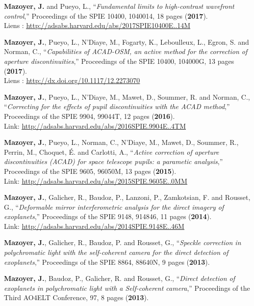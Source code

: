 \documentclass[11pt,a4paper, french]{article}
\begin{document}
\begin{etaremune}

\item \textbf{Mazoyer, J.} and Pueyo, L., “\textit{Fundamental limits to high-contrast wavefront control},” Proceedings of the SPIE 10400, 1040014, 18 pages (\textbf{2017}).\\
Liens : \textcolor{BrickRed}{\underline{\url{http://adsabs.harvard.edu/abs/2017SPIE10400E..14M}}}
\item \textbf{Mazoyer, J.}, Pueyo, L., N’Diaye, M., Fogarty, K., Leboulleux, L., Egron, S. and Norman, C., “\textit{Capabilities of ACAD-OSM, an active method for the correction of aperture discontinuities},” Proceedings of the SPIE 10400, 104000G, 13 pages (\textbf{2017}).\\
Liens : \textcolor{BrickRed}{\underline{\url{http://dx.doi.org/10.1117/12.2273070}}}
\item \textbf{Mazoyer, J.}, Pueyo, L., N’Diaye, M., Mawet, D., Soummer, R. and Norman, C., “\textit{Correcting for the effects of pupil discontinuities with the ACAD method},” Proceedings of the SPIE 9904, 99044T, 12 pages (\textbf{2016}).\\
Link: \textcolor{BrickRed}{\underline{\url{http://adsabs.harvard.edu/abs/2016SPIE.9904E..4TM}}}
\item \textbf{Mazoyer, J.}, Pueyo, L., Norman, C., N’Diaye, M., Mawet, D., Soummer, R., Perrin, M., Choquet, É. and Carlotti, A., “\textit{Active correction of aperture discontinuities (ACAD) for space telescope pupils: a parametic analysis},” Proceedings of the SPIE 9605, 96050M, 13 pages (\textbf{2015}).\\
Link: \textcolor{BrickRed}{\underline{\url{http://adsabs.harvard.edu/abs/2015SPIE.9605E..0MM}}}
\item \textbf{Mazoyer, J.}, Galicher, R., Baudoz, P., Lanzoni, P., Zamkotsian, F. and Rousset, G., “\textit{Deformable mirror interferometric analysis for the direct imagery of exoplanets},” Proceedings of the SPIE 9148, 914846, 11 pages (\textbf{2014}).\\
Link: \textcolor{BrickRed}{\underline{\url{http://adsabs.harvard.edu/abs/2014SPIE.9148E..46M}}}
\item \textbf{Mazoyer, J.}, Galicher, R., Baudoz, P. and Rousset, G., “\textit{Speckle correction in polychromatic light with the self-coherent camera for the direct detection of exoplanets},” Proceedings of the SPIE 8864, 88640N, 9 pages (\textbf{2013}).\\
\item \item \textbf{Mazoyer, J.}, Baudoz, P., Galicher, R. and Rousset, G., “\textit{Direct detection of exoplanets in polychromatic light with a Self-coherent camera},” Proceedings of the Third AO4ELT Conference, 97, 8 pages (\textbf{2013}).

\end{etaremune}
\end{document}
